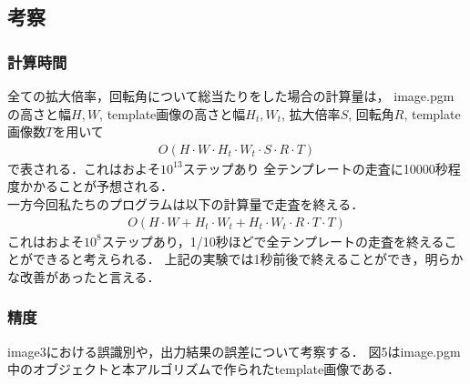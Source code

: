 \documentclass[uplatex,dvipdfmx]{jsarticle}
\begin{document}
\subsection{考察}
\subsubsection{計算時間}
全ての拡大倍率，回転角について総当たりをした場合の計算量は，
image.pgmの高さと幅$H, W$, template画像の高さと幅$H_t, W_t$,
拡大倍率$S$, 回転角$R$, template画像数$T$を用いて
\begin{align*}
  O(H \cdot W \cdot H_t \cdot W_t \cdot S \cdot R \cdot T)
\end{align*}
で表される．これはおよそ$10^{13}$ステップあり
全テンプレートの走査に10000秒程度かかることが予想される．\\
一方今回私たちのプログラムは以下の計算量で走査を終える．
\begin{align*}
  O(H \cdot W + H_t \cdot W_t + H_t \cdot W_t \cdot  R \cdot T \cdot T)
\end{align*}
これはおよそ$10^8$ステップあり，1/10秒ほどで全テンプレートの走査を終えることができると考えられる．
上記の実験では1秒前後で終えることができ，明らかな改善があったと言える．

\subsubsection{精度}
image3における誤識別や，出力結果の誤差について考察する．
図5はimage.pgm中のオブジェクトと本アルゴリズムで作られたtemplate画像である．
\end{document}
